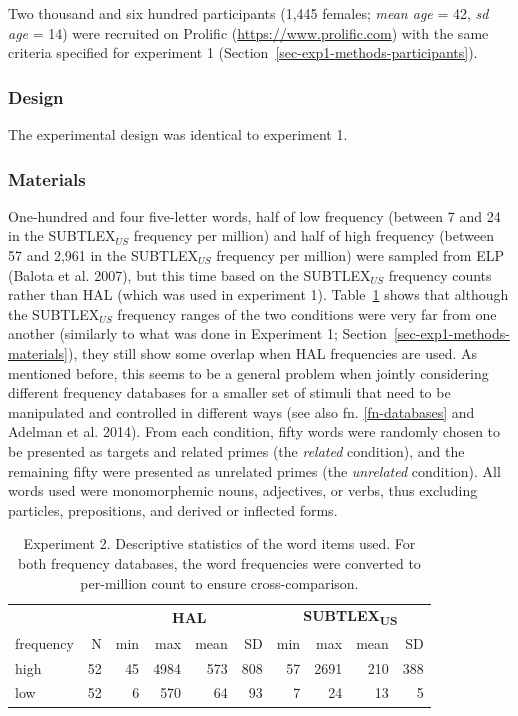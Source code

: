 \documentclass[
]{interact}
\begin{document}
Two thousand and six hundred participants (1,445 females; \emph{mean
age} = 42, \emph{sd age} = 14) were recruited on Prolific
(\url{https://www.prolific.com}) with the same criteria specified for
experiment 1 (Section~\ref{sec-exp1-methods-participants}).

\subsubsection{Design}\label{sec-exp2-methods-design}

The experimental design was identical to experiment 1.

\subsubsection{Materials}\label{sec-exp2-methods-materials}

One-hundred and four five-letter words, half of low frequency (between 7
and 24 in the SUBTLEX\(_{US}\) frequency per million) and half of high
frequency (between 57 and 2,961 in the SUBTLEX\(_{US}\) frequency per
million) were sampled from ELP (Balota et al. 2007), but this time based
on the SUBTLEX\(_{US}\) frequency counts rather than HAL (which was used
in experiment 1). Table~\ref{tbl-words_exp2} shows that although the
SUBTLEX\(_{US}\) frequency ranges of the two conditions were very far
from one another (similarly to what was done in Experiment 1;
Section~\ref{sec-exp1-methods-materials}), they still show some overlap
when HAL frequencies are used. As mentioned before, this seems to be a
general problem when jointly considering different frequency databases
for a smaller set of stimuli that need to be manipulated and controlled
in different ways (see also fn. \ref{fn-databases} and Adelman et al.
2014). From each condition, fifty words were randomly chosen to be
presented as targets and related primes (the \emph{related} condition),
and the remaining fifty were presented as unrelated primes (the
\emph{unrelated} condition). All words used were monomorphemic nouns,
adjectives, or verbs, thus excluding particles, prepositions, and
derived or inflected forms.

\begin{longtable}{lrrrrrrrrr}

\caption{\label{tbl-words_exp2}Experiment 2. Descriptive statistics of
the word items used. For both frequency databases, the word frequencies
were converted to per-million count to ensure cross-comparison.}

\tabularnewline

\toprule
 &  & \multicolumn{4}{c}{\textbf{HAL}} & \multicolumn{4}{c}{\textbf{SUBTLEX\textsubscript{US}}} \\ 
\cmidrule(lr){3-6} \cmidrule(lr){7-10}
frequency & N & min & max & mean & SD & min & max & mean & SD \\ 
\midrule\addlinespace[2.5pt]
high & 52 & 45 & 4984 & 573 & 808 & 57 & 2691 & 210 & 388 \\ 
low & 52 & 6 & 570 & 64 & 93 & 7 & 24 & 13 & 5 \\ 
\bottomrule

\end{longtable}
\end{document}
